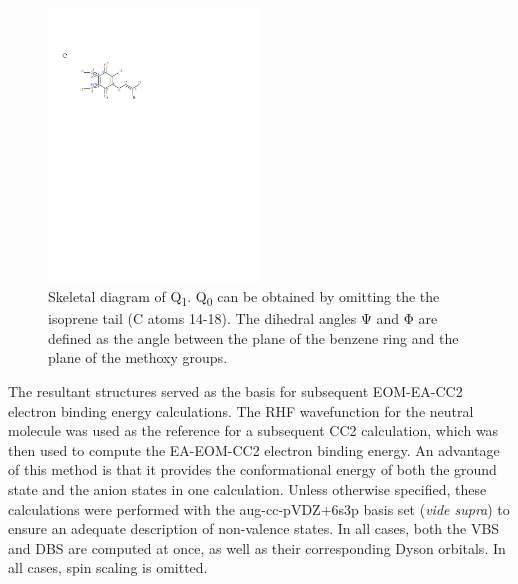 \begin{figure}
    \centering
    \includegraphics[width=0.5\textwidth]{chapters/methods/image/Q1-labelled.pdf}
    \caption{Skeletal diagram of Q\textsubscript{1}. Q\textsubscript{0} can be obtained by omitting the the isoprene tail (C atoms 14-18). The dihedral angles $\mathrm{\Psi}$ and $\mathrm{\Phi}$ are defined as the angle between the plane of the benzene ring and the plane of the methoxy groups.}\label{fig:quinone_dihedral_scan}
\end{figure}

The resultant structures served as the basis for subsequent EOM-EA-CC2 electron binding energy calculations. The RHF wavefunction for the neutral molecule was used as the reference for a subsequent CC2 calculation, which was then used to compute the EA-EOM-CC2 electron binding energy. An advantage of this method is that it provides the conformational energy of both the ground state and the anion states in one calculation. Unless otherwise specified, these calculations were performed with the aug-cc-pVDZ+6s3p basis set (\textit{vide supra}) to ensure an adequate description of non-valence states. In all cases, both the VBS and DBS are computed at once, as well as their corresponding Dyson orbitals. In all cases, spin scaling is omitted. %


